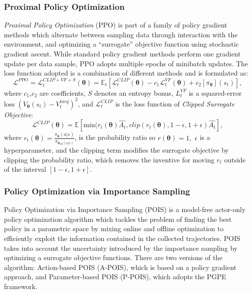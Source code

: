 \subsubsection{Proximal Policy Optimization}
\label{ppo}
\textit{Proximal Policy Optimization} (PPO) is part of a family of policy gradient methods which alternate between sampling data through interaction with the environment, and optimizing a
“surrogate” objective function using stochastic gradient ascent. While standard policy gradient methods perform one gradient update per data sample, PPO adopts multiple epochs of minibatch updates. 
The loss function adopted is a combination of different methods and is formulated as:
\begin{equation}
    \mathcal{L}^{PPO} = \mathcal{L}_t^{CLIP+VF+S}(\boldsymbol \theta) = \mathbb{E}_t\left[\mathcal{L}^{CLIP}_t(\boldsymbol \theta) -c_1 \mathcal{L}_t^{VF}(\boldsymbol \theta) + c_2[\pi_{\boldsymbol \theta}](s_t)\right],
\end{equation}
where $c_1$,$c_2$ are coefficients, $S$ denotes an entropy bonus, $L_t^{VF}$ is a squared-error loss $\left(V_{\boldsymbol \theta}(s_t)-V_t^{targ}\right)^2$, and $\mathcal{L}^{CLIP}_t$ is the loss function of \textit{Clipped Surrogate Objective}:
\begin{equation}
    \mathcal{L}^{CLIP}(\boldsymbol \theta) = \mathbb{E}\left[\text{min}(r_t(\boldsymbol \theta) \hat{A_t},clip(r_t(\boldsymbol \theta),1-\epsilon,1+\epsilon)\hat{A_t}\right],
\end{equation}
where $r_t(\boldsymbol \theta) = \frac{\pi_{\boldsymbol \theta}(a|s)}{\pi_{\boldsymbol \theta_{old}(a|s)}}$, is the probability ratio so $r(\boldsymbol \theta)=1,$ $\epsilon$ is a hyperparameter, and the clipping term modifies the surrogate objective by clipping the probability ratio, which removes the inventive for moving $r_t$ outside of the interval $[1-\epsilon,1+\epsilon]$.

\subsubsection{Policy Optimization via Importance Sampling}
\label{sec_POIS}

Policy Optimization via Importance Sampling (POIS) \cite{pois} is a model-free actor-only policy optimization algorithm which tackles the problem of finding the best policy in a parametric space by mixing online and offline optimization to efficiently exploit the information contained in the collected trajectories. POIS takes into account the uncertainty introduced  by the importance sampling by optimizing a surrogate objective functions. 
There are two versions of the algorithm: Action-based POIS (A-POIS), which is based on a policy gradient approach, and Parameter-based POIS (P-POIS), which adopts the PGPE framework.

